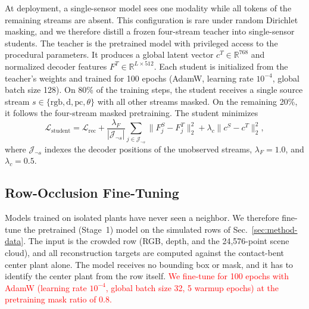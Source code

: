 \documentclass[10pt,twocolumn,letterpaper]{article}
\providecommand{\R}{\mathbb{R}}
\begin{document}
At deployment, a single-sensor model sees one modality while all tokens of the remaining streams are absent. This configuration is rare under random Dirichlet masking, and we therefore distill a frozen four-stream teacher into single-sensor students. The teacher is the pretrained model with privileged access to the procedural parameters. %
It produces a global latent vector $c^T \in \R^{768}$ and normalized decoder features $F^T \in \R^{L \times 512}$. Each student is initialized from the teacher's weights and trained for 100 epochs (AdamW, learning rate $10^{-4}$, global batch size 128). On 80\% of the training steps, the student receives a single source stream $s \in \{\mathrm{rgb}, \mathrm{d}, \mathrm{pc}, \theta\}$ with all other streams masked. On the remaining 20\%, it follows the four-stream masked pretraining. The student minimizes
\begin{equation}
  \mathcal{L}_{\mathrm{student}} = \mathcal{L}_{\mathrm{rec}} + \frac{\lambda_F}{|\mathcal{J}_{\neg s}|} \sum_{j \in \mathcal{J}_{\neg s}} \|F^S_j - F^T_j\|_2^2 + \lambda_c \|c^S - c^T\|_2^2,
  \label{eq:distillation-loss}
\end{equation}
where $\mathcal{J}_{\neg s}$ indexes the decoder positions of the unobserved streams, $\lambda_F = 1.0$, and $\lambda_c = 0.5$. %


\subsection{Row-Occlusion Fine-Tuning}
\label{sec:method-rows}

Models trained on isolated plants have never seen a neighbor. %
We therefore fine-tune the pretrained (Stage~1) model on the simulated rows of Sec.~\ref{sec:method-data}. The input is the crowded row (RGB, depth, and the 24{,}576-point scene cloud), and all reconstruction targets are computed against the contact-bent center plant alone. The model receives no bounding box or mask, and it has to identify the center plant from the row itself. \textcolor{red}{We fine-tune for 100 epochs with AdamW (learning rate $10^{-4}$, global batch size 32, 5 warmup epochs) at the pretraining mask ratio of 0.8.}

\end{document}
